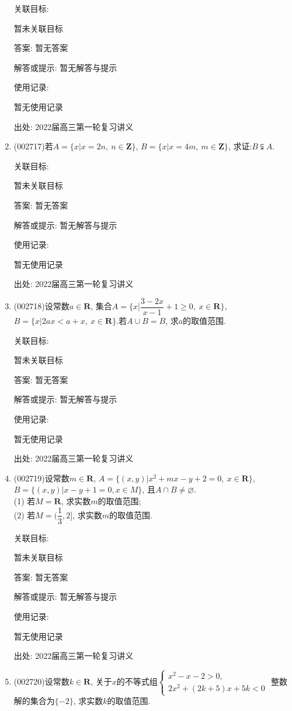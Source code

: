 \documentclass[10pt,a4paper]{article}
\begin{document}
\begin{enumerate}[1.]
关联目标:

暂未关联目标

答案: 暂无答案

解答或提示: 暂无解答与提示

使用记录:

暂无使用记录


出处: 2022届高三第一轮复习讲义
\item { (002717)}若$A=\{x|x=2n,\ n\in \mathbf{Z}\}$, $B=\{x|x=4m,\ m\in \mathbf{Z}\}$, 求证:$B\subsetneqq A$.


关联目标:

暂未关联目标

答案: 暂无答案

解答或提示: 暂无解答与提示

使用记录:

暂无使用记录


出处: 2022届高三第一轮复习讲义
\item { (002718)}设常数$a\in \mathbf{R}$, 集合$A=\{x|\dfrac{3-2x}{x-1}+1 \ge 0, \ x\in \mathbf{R}\}$, $B=\{x|2ax<a+x, \ x\in \mathbf{R} \}$.若$A\cup B=B$, 求$a$的取值范围.


关联目标:

暂未关联目标

答案: 暂无答案

解答或提示: 暂无解答与提示

使用记录:

暂无使用记录


出处: 2022届高三第一轮复习讲义
\item { (002719)}设常数$m\in \mathbf{R}$, $A=\{(x,y)|x^2+mx-y+2=0,\ x\in \mathbf{R}\}$, $B=\{(x,y)|x-y+1=0, x\in M\}$, 且$A\cap B\ne\varnothing$.\\
(1) 若$M=\mathbf{R}$, 求实数$m$的取值范围;\\
(2) 若$M=(\dfrac13,2]$, 求实数$m$的取值范围.


关联目标:

暂未关联目标

答案: 暂无答案

解答或提示: 暂无解答与提示

使用记录:

暂无使用记录


出处: 2022届高三第一轮复习讲义
\item { (002720)}设常数$k\in \mathbf{R}$, 关于$x$的不等式组$\begin{cases} x^2-x-2>0, \\ 2x^2+(2k+5)x+5k<0 \end{cases}$ 整数解的集合为$\{-2\}$, 求实数$k$的取值范围.



\end{enumerate}
\end{document}
